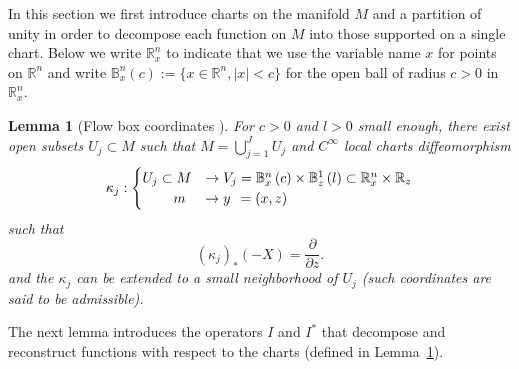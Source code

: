 \documentclass[10pt]{amsart}
\newtheorem{lemm}[theo]{Lemma}\newtheorem{prop}[theo]{Proposition}\newtheorem{coro}[theo]{Corollary}\newtheorem{conj}[theo]{Conjecture}
\theoremstyle{definition}\newtheorem{defi}[theo]{Definition}\newtheorem{rema}[theo]{Remark}\newtheorem{exam}[theo]{Example}\newtheorem{exem}[theo]{Example}\newtheorem{nota}[theo]{Notation}
\newcommand{\bbR}{\mathbb{R}}
\newcommand{\bbB}{\mathbb{B}}
\begin{document}
In this section we first introduce charts on the manifold $M$ and a partition of unity in order to decompose each function on $M$ into those supported on a single chart. Below we write $\bbR_{x}^{n}$ to indicate that we use the variable name $x$ for points on $\bbR^{n}$ and write $\bbB _{x}^{n}(c):=\{ x\in\bbR^{n},|x|<c\} $ for the open ball of radius $c>0$ in $\bbR_{x}^{n}$.

\begin{lemm}[{Flow box coordinates
\cite[p.~33]{taylor_tome1}}]\label{lem:charts}
For $c>0$ and $l>0$ small enough, there exist open subsets $U_{j}\subset M$ such that $M=\bigcup_{j=1}^{J}U_{j}$ and $C^{\infty}$ local charts diffeomorphism
\begin{equation}\label{eq:def_kappa_j}
\kappa_{j}:
\begin{cases}
U_{j}\subset M & \rightarrow V_{j}=\bbB _{x}^{n}\left(c\right)\times\bbB _{z}^{1}\left(l\right)\subset\bbR_{x}^{n}\times\bbR_{z}\\
\mkern40mu m & \to y\;\,=\left(x,z\right)
\end{cases}
\end{equation}
such that
\begin{equation}\label{eq:X}
\left(\kappa_{j}\right)_{*}\left(-X\right) =\frac{\partial}{\partial z}.
\end{equation}
and the $\kappa_{j}$ can be extended to a small neighborhood of $U_{j}$ (such coordinates are said to be admissible).
\end{lemm}

The next lemma introduces the operators $I$ and $I^{*}$ that decompose and reconstruct functions with respect to the charts (defined in Lemma~\ref{lem:charts}).
\end{document}
